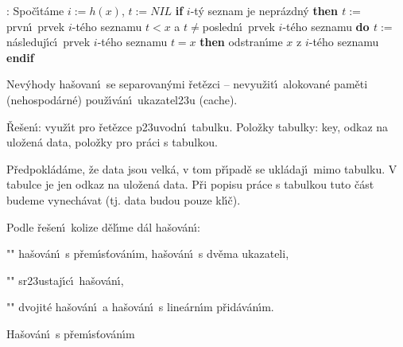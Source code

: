 :\newline 
Spo\v c\'\i t\'ame $i:=h\left(x\right)$, $t:=NIL$
{\bf if} $i$-t\'y seznam je nepr\'azdn\'y {\bf then\newline 
\phantom{{\rm ---}}$t:=$}prvn\'\i\ prvek $i$-t\'eho seznamu\newline 
\phantom{---}{\bf while} $t<x$ a $t\ne$posledn\'\i\ prvek $i$-t\'eho seznamu {\bf do\newline 
\phantom{{\rm ------}}$t:=$}n\'asleduj\'\i c\'\i\ prvek $i$-t\'eho seznamu\newline 
\phantom{---}{\bf enddo\newline 
endif\newline 
if} $t=x$ {\bf then} odstran\'\i me $x$ z $i$-t\'eho seznamu {\bf endif}
\medskip

\flushpar Nev\'yhody ha\v sovan\'\i\ se separovan\'ymi \v ret\v ezci --\newline 
\phantom{---}nevyu\v zit\'\i\ alokovan\'e pam\v eti (nehospod\'arn\'e)\newline 
\phantom{---}pou\v z\'\i v\'an\'\i\ ukazatel\accent23u (cache).\newline 

\flushpar\v Re\v sen\'\i : vyu\v z\'\i t pro \v ret\v ezce p\accent23uvodn\'\i\ tabulku. 
\medskip
\flushpar Polo\v zky tabulky:\newline 
\phantom{---}key,\newline 
\phantom{---}odkaz na ulo\v zen\'a data,\newline 
\phantom{---}polo\v zky pro pr\'aci s tabulkou.
\medskip

\flushpar P\v redpokl\'ad\'ame, \v ze data jsou velk\'a, v tom p\v r\'\i pad\v e se 
ukl\'adaj\'\i\ mimo tabulku. V tabulce je jen odkaz na ulo\v zen\'a data. 
P\v ri popisu pr\'ace s tabulkou tuto \v c\'ast budeme vynech\'avat (tj. 
data budou pouze kl\'\i\v c).
\medskip

\flushpar Podle \v re\v sen\'\i\ kolize d\v el\'\i me d\'al ha\v sov\'an\'\i :
\roster
\item"{}"
ha\v sov\'an\'\i\ s p\v rem\'\i s\v tov\'an\'\i m, ha\v sov\'an\'\i\ s dv\v ema 
ukazateli, 
\item"{}"
sr\accent23ustaj\'\i c\'\i\ ha\v sov\'an\'\i,
\item"{}"
dvojit\'e ha\v sov\'an\'\i\ a ha\v sov\'an\'\i\ s line\'arn\'\i m 
p\v rid\'av\'an\'\i m.
\endroster 

\heading
Ha\v sov\'an\'\i\ s p\v rem\'\i s\v tov\'an\'\i m
\endheading

